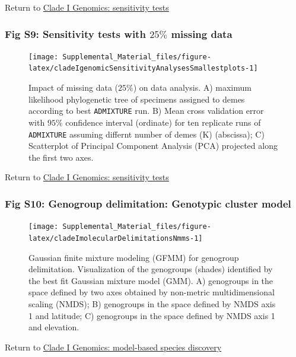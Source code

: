 \documentclass[
  11pt,
]{article}
\begin{document}
Return to \protect\hyperlink{sensitivity-tests}{Clade I Genomics: sensitivity tests}
\pagebreak

\hypertarget{fig-s9-sensitivity-tests-with-25-missing-data}{%
\subsubsection{\texorpdfstring{Fig S9: Sensitivity tests with \(25\%\) missing data}{Fig S9: Sensitivity tests with 25\textbackslash\% missing data}}\label{fig-s9-sensitivity-tests-with-25-missing-data}}

\begin{figure}
\texttt{[image: Supplemental\_Material\_files/figure-latex/cladeIgenomicSensitivityAnalysesSmallestplots-1]} \caption{Impact of missing data ($25\%$) on data analysis. A) maximum likelihood phylogenetic tree of specimens assigned to demes according to best \texttt{ADMIXTURE} run. B) Mean cross validation error with $95\%$ confidence interval (ordinate) for ten replicate runs of \texttt{ADMIXTURE} assuming differnt number of demes (K) (abscissa); C) Scatterplot of Principal Component Analysis (PCA) projected along the first two axes.}\label{fig:cladeIgenomicSensitivityAnalysesSmallestplots}
\end{figure}

Return to \protect\hyperlink{sensitivity-tests}{Clade I Genomics: sensitivity tests}
\pagebreak

\hypertarget{fig-s10-genogroup-delimitation-genotypic-cluster-model}{%
\subsubsection{Fig S10: Genogroup delimitation: Genotypic cluster model}\label{fig-s10-genogroup-delimitation-genotypic-cluster-model}}

\begin{figure}
\texttt{[image: Supplemental\_Material\_files/figure-latex/cladeImolecularDelimitationsNmms-1]} \caption{Gaussian finite mixture modeling (GFMM) for genogroup delimitation. Visualization of the genogroups (shades) identified by the best fit Gaussian mixture model (GMM). A) genogroups in the space defined by two axes obtained by non-metric multidimensional scaling (NMDS); B) genogroups in the space defined by NMDS axis 1 and latitude; C) genogroups in the space defined by NMDS axis 1 and elevation.}\label{fig:cladeImolecularDelimitationsNmms}
\end{figure}

Return to \protect\hyperlink{model-based-species-discovery-1}{Clade I Genomics: model-based species discovery}
\pagebreak
\end{document}
